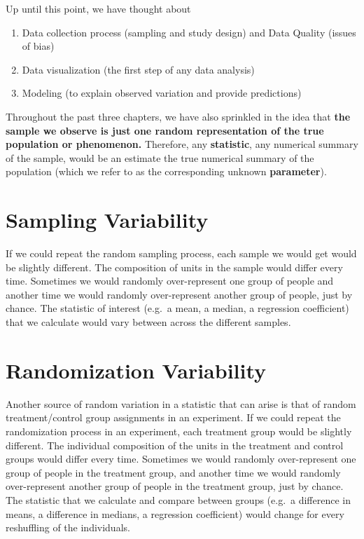\documentclass[
]{book}
\providecommand{\tightlist}{%
  \setlength{\itemsep}{0pt}\setlength{\parskip}{0pt}}
\begin{document}
Up until this point, we have thought about

\begin{enumerate}
\def\labelenumi{\arabic{enumi}.}
\tightlist
\item
  Data collection process (sampling and study design) and Data Quality (issues of bias)
\item
  Data visualization (the first step of any data analysis)
\item
  Modeling (to explain observed variation and provide predictions)
\end{enumerate}

Throughout the past three chapters, we have also sprinkled in the idea that \textbf{the sample we observe is just one random representation of the true population or phenomenon.} Therefore, any \textbf{statistic}, any numerical summary of the sample, would be an estimate the true numerical summary of the population (which we refer to as the corresponding unknown \textbf{parameter}).

\hypertarget{sampling-variability}{%
\section{Sampling Variability}\label{sampling-variability}}

If we could repeat the random sampling process, each sample we would get would be slightly different. The composition of units in the sample would differ every time. Sometimes we would randomly over-represent one group of people and another time we would randomly over-represent another group of people, just by chance. The statistic of interest (e.g.~a mean, a median, a regression coefficient) that we calculate would vary between across the different samples.

\hypertarget{randomization-variability}{%
\section{Randomization Variability}\label{randomization-variability}}

Another source of random variation in a statistic that can arise is that of random treatment/control group assignments in an experiment. If we could repeat the randomization process in an experiment, each treatment group would be slightly different. The individual composition of the units in the treatment and control groups would differ every time. Sometimes we would randomly over-represent one group of people in the treatment group, and another time we would randomly over-represent another group of people in the treatment group, just by chance. The statistic that we calculate and compare between groups (e.g.~a difference in means, a difference in medians, a regression coefficient) would change for every reshuffling of the individuals.
\end{document}
